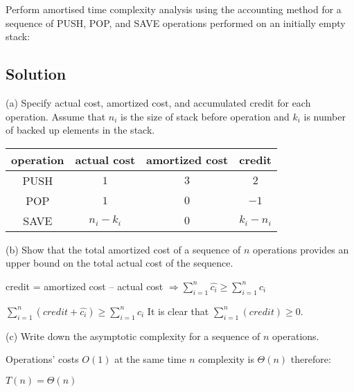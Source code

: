 \documentclass{article}
\begin{document}
Perform amortised time complexity analysis using the accounting method for a sequence of PUSH, POP, and SAVE operations performed on an initially empty stack:


\subsection{Solution}

(a) Specify actual cost, amortized cost, and accumulated credit for each operation. Assume that $n_{i}$ is the size of stack before operation and $k_{i}$ is number of backed up elements in the stack.


\begin{center}
\begin{tabular}{|c||c|c|c|}
\hline
operation & actual cost & amortized cost & credit \\
\hline\hline
PUSH & $1$ & $3$ & $2$ \\
\hline
POP & $1$ & $0$ & $-1$ \\
\hline
SAVE & $n_i-k_i$  & $0$ & $k_i - n_i$ \\
\hline
\end{tabular}
\end{center}

(b) Show that the total amortized cost of a sequence of $n$ operations provides an upper bound on the total actual cost of the sequence.  

credit = amortized cost – actual cost $ \Rightarrow  \sum_{i=1}^{n} \hat{c_i} \geq \sum_{i=1}^{n} {c_i} $ 

$ \sum_{i=1}^{n}(credit + \hat{c_i}) \geq \sum_{i=1}^{n} {c_i}$
It is clear that $ \sum_{i=1}^{n}(credit) \geq 0$.


(c) Write down the asymptotic complexity for a sequence of $n$ operations.

    Operations' costs $O(1)$ at the same time $n$ complexity is $\Theta(n)$ therefore:

    
    $T(n) = \Theta(n)$
    
\end{document}
